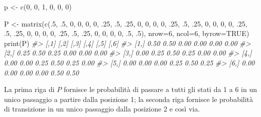 \documentclass[
]{memoir}
\newenvironment{Shaded}{\begin{snugshade}}{\end{snugshade}}
\newcommand{\AttributeTok}[1]{\textcolor[rgb]{0.77,0.63,0.00}{#1}}
\newcommand{\CommentTok}[1]{\textcolor[rgb]{0.56,0.35,0.01}{\textit{#1}}}
\newcommand{\ConstantTok}[1]{\textcolor[rgb]{0.00,0.00,0.00}{#1}}
\newcommand{\DecValTok}[1]{\textcolor[rgb]{0.00,0.00,0.81}{#1}}
\newcommand{\FunctionTok}[1]{\textcolor[rgb]{0.00,0.00,0.00}{#1}}
\newcommand{\NormalTok}[1]{#1}
\newcommand{\OtherTok}[1]{\textcolor[rgb]{0.56,0.35,0.01}{#1}}
\begin{document}
\begin{Shaded}
\begin{Highlighting}[]
\NormalTok{p }\OtherTok{\textless{}{-}} \FunctionTok{c}\NormalTok{(}\DecValTok{0}\NormalTok{, }\DecValTok{0}\NormalTok{, }\DecValTok{1}\NormalTok{, }\DecValTok{0}\NormalTok{, }\DecValTok{0}\NormalTok{, }\DecValTok{0}\NormalTok{)}

\NormalTok{P }\OtherTok{\textless{}{-}} \FunctionTok{matrix}\NormalTok{(}\FunctionTok{c}\NormalTok{(.}\DecValTok{5}\NormalTok{, .}\DecValTok{5}\NormalTok{, }\DecValTok{0}\NormalTok{, }\DecValTok{0}\NormalTok{, }\DecValTok{0}\NormalTok{, }\DecValTok{0}\NormalTok{,}
\NormalTok{              .}\DecValTok{25}\NormalTok{, .}\DecValTok{5}\NormalTok{, .}\DecValTok{25}\NormalTok{, }\DecValTok{0}\NormalTok{, }\DecValTok{0}\NormalTok{, }\DecValTok{0}\NormalTok{,}
              \DecValTok{0}\NormalTok{, .}\DecValTok{25}\NormalTok{, .}\DecValTok{5}\NormalTok{, .}\DecValTok{25}\NormalTok{, }\DecValTok{0}\NormalTok{, }\DecValTok{0}\NormalTok{,}
              \DecValTok{0}\NormalTok{, }\DecValTok{0}\NormalTok{, .}\DecValTok{25}\NormalTok{, .}\DecValTok{5}\NormalTok{, .}\DecValTok{25}\NormalTok{, }\DecValTok{0}\NormalTok{,}
              \DecValTok{0}\NormalTok{, }\DecValTok{0}\NormalTok{, }\DecValTok{0}\NormalTok{, .}\DecValTok{25}\NormalTok{, .}\DecValTok{5}\NormalTok{, .}\DecValTok{25}\NormalTok{,}
              \DecValTok{0}\NormalTok{, }\DecValTok{0}\NormalTok{, }\DecValTok{0}\NormalTok{, }\DecValTok{0}\NormalTok{, .}\DecValTok{5}\NormalTok{, .}\DecValTok{5}\NormalTok{),}
            \AttributeTok{nrow=}\DecValTok{6}\NormalTok{, }\AttributeTok{ncol=}\DecValTok{6}\NormalTok{, }\AttributeTok{byrow=}\ConstantTok{TRUE}\NormalTok{)}
\FunctionTok{print}\NormalTok{(P)}
\CommentTok{\#\textgreater{}      [,1] [,2] [,3] [,4] [,5] [,6]}
\CommentTok{\#\textgreater{} [1,] 0.50 0.50 0.00 0.00 0.00 0.00}
\CommentTok{\#\textgreater{} [2,] 0.25 0.50 0.25 0.00 0.00 0.00}
\CommentTok{\#\textgreater{} [3,] 0.00 0.25 0.50 0.25 0.00 0.00}
\CommentTok{\#\textgreater{} [4,] 0.00 0.00 0.25 0.50 0.25 0.00}
\CommentTok{\#\textgreater{} [5,] 0.00 0.00 0.00 0.25 0.50 0.25}
\CommentTok{\#\textgreater{} [6,] 0.00 0.00 0.00 0.00 0.50 0.50}
\end{Highlighting}
\end{Shaded}

La prima riga di \(P\) fornisce le probabilità di passare a tutti gli stati da 1 a 6 in un unico passaggio a partire dalla posizione 1; la seconda riga fornisce le probabilità di transizione in un unico passaggio dalla posizione 2 e così via.
\end{document}
